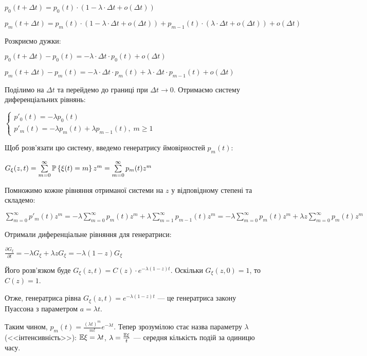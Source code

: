 $p_0(t+\Delta t) = p_0(t) \cdot (1 - \lambda \cdot \Delta t + o(\Delta t))$

$p_m(t+\Delta t) = p_m(t) \cdot (1 - \lambda \cdot \Delta t + o(\Delta t)) + p_{m-1}(t) \cdot (\lambda \cdot \Delta t + o(\Delta t)) + o(\Delta t)$

\noindent Розкриємо дужки:

$p_0(t+\Delta t) - p_0(t) = -\lambda \cdot \Delta t \cdot p_0(t) + o(\Delta t)$
\nopagebreak

$p_m(t+\Delta t) - p_m(t) = -\lambda \cdot \Delta t \cdot p_m(t) + \lambda\cdot\Delta t \cdot p_{m-1}(t) + o(\Delta t)$

\noindent Поділимо на $\Delta t$ та перейдемо до границі при $\Delta t \rightarrow 0$.
Отримаємо систему диференціальних рівнянь:

$\begin{cases}
    p'_0(t) = - \lambda p_0(t) \\
    p'_m(t) = - \lambda p_m(t) + \lambda p_{m-1}(t), \; m \geq 1
\end{cases}$

\noindent Щоб розв'язати цю систему, введемо генератрису ймовірностей $p_m(t)$:

$G_\xi(z, t) = \sum\limits_{m=0}^{\infty} \P\left\{\xi(t) = m\right\} z^m = \sum\limits_{m=0}^{\infty} p_m(t) z^m$ 

\noindent Помножимо кожне рівняння отриманої системи на $z$ у відповідному степені та складемо:

$\sum\limits_{m=0}^{\infty} p'_m(t) z^m = -\lambda \sum\limits_{m=0}^{\infty} p_m(t) z^m + \lambda \sum\limits_{m=1}^{\infty} p_{m-1}(t) z^m = 
-\lambda \sum\limits_{m=0}^{\infty} p_m(t) z^m + \lambda z \sum\limits_{m=0}^{\infty} p_{m}(t) z^m$

\noindent Отримали диференціальне рівняння для генератриси:

$\frac{\partial G_\xi}{\partial t} = - \lambda G_\xi + \lambda z G_\xi = -\lambda(1-z) G_\xi$

\noindent Його розв'язком буде $G_\xi(z, t) = C(z) \cdot e^{-\lambda(1-z)t}$.
Оскільки $G_\xi(z, 0) = 1$, то $C(z) = 1$.

Отже, генератриса рівна $G_\xi(z, t) = e^{-\lambda(1-z)t}$ --- це генератриса закону Пуассона з параметром $a=\lambda t$.

Таким чином, $p_m(t) = \frac{(\lambda t)^m}{m!}e^{-\lambda t}$. 
Тепер зрозумілою стає назва параметру $\lambda$ (<<інтенсивність>>): $\E\xi = \lambda t$, $\lambda = \frac{\E\xi}{t}$ --- середня кількість подій за одиницю часу.

